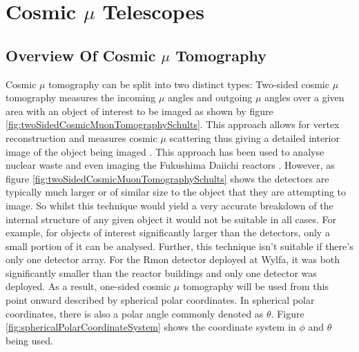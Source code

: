 
\chapter{Cosmic $\mu$ Telescopes}\label{chp:cosmicMuTelescopes}

\ifpdf
    \graphicspath{{Chapter5/Figs/Raster/}{Chapter5/Figs/PDF/}{Chapter5/Figs/}}
\else
    \graphicspath{{Chapter5/Figs/Vector/}{Chapter5/Figs/}}
\fi


\section{Overview Of Cosmic $\mu$ Tomography}\label{sec:cosMuOverview}
Cosmic $\mu$ tomography can be split into two distinct types: Two-sided cosmic $\mu$ tomography measures the incoming $\mu$ angles and outgoing $\mu$ angles over a given area with an object of interest to be imaged as shown by figure \ref{fig:twoSidedCosmicMuonTomographySchults}. This approach allows for vertex reconstruction and measures cosmic $\mu$ scattering thus giving a detailed interior image of the object being imaged \cite{schultz_2007}. This approach has been used to analyse nuclear waste \cite{jonkmans2013nuclear} and even imaging the Fukushima Daiichi reactors \cite{miyadera2013imaging}. However, as figure \ref{fig:twoSidedCosmicMuonTomographySchults} shows the  detectors are typically much larger or of similar size to the object that they are attempting to image. So whilst this technique would yield a very accurate breakdown of the internal structure of any given object it would not be suitable in all cases. For example, for objects of interest significantly larger than the detectors, only a small portion of it can be analysed. Further, this technique isn't suitable if there's only one detector array. For the Rmon detector deployed at Wylfa, it was both significantly smaller than the reactor buildings and only one detector was deployed. As a result, one-sided cosmic $\mu$ tomography will be used from this point onward described by spherical polar coordinates. In spherical polar coordinates, there is also a polar angle commonly denoted as $\theta$. Figure \ref{fig:sphericalPolarCoordinateSystem} shows the coordinate system in $\phi$ and $\theta$ being used.

